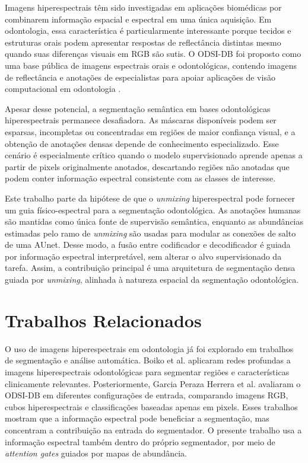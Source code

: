 \documentclass[conference]{IEEEtran}
\begin{document}
Imagens hiperespectrais têm sido investigadas em aplicações biomédicas por
combinarem informação espacial e espectral em uma única aquisição. Em
odontologia, essa característica é particularmente interessante porque tecidos e
estruturas orais podem apresentar respostas de reflectância distintas mesmo
quando suas diferenças visuais em RGB são sutis. O ODSI-DB foi proposto como
uma base pública de imagens espectrais orais e odontológicas, contendo imagens
de reflectância e anotações de especialistas para apoiar aplicações de visão
computacional em odontologia \cite{hyttinen2020odsi}.

Apesar desse potencial, a segmentação semântica em bases odontológicas
hiperespectrais permanece desafiadora. As máscaras disponíveis podem ser
esparsas, incompletas ou concentradas em regiões de maior confiança visual, e a
obtenção de anotações densas depende de conhecimento especializado. Esse cenário
é especialmente crítico quando o modelo supervisionado aprende apenas a partir de
pixels originalmente anotados, descartando regiões não anotadas que podem conter
informação espectral consistente com as classes de interesse.

Este trabalho parte da hipótese de que o \textit{unmixing} hiperespectral pode
fornecer um guia físico-espectral para a segmentação odontológica. As anotações
humanas são mantidas como única fonte de supervisão semântica, enquanto as
abundâncias estimadas pelo ramo de \textit{unmixing} são usadas para modular as
conexões de salto de uma AUnet. Desse modo, a fusão entre codificador
e decodificador é guiada por informação espectral interpretável, sem alterar o
alvo supervisionado da tarefa. Assim, a contribuição principal é uma arquitetura
de segmentação densa guiada por \textit{unmixing}, alinhada à natureza espacial
da segmentação odontológica.

\section{Trabalhos Relacionados}

O uso de imagens hiperespectrais em odontologia já foi explorado em trabalhos de
segmentação e análise automática. Boiko et al. \cite{boiko2019dentalhsi}
aplicaram redes profundas a imagens hiperespectrais odontológicas para segmentar
regiões e características clinicamente relevantes. Posteriormente, Garcia Peraza
Herrera et al. \cite{garcia2023odsisegmentation} avaliaram o ODSI-DB em
diferentes configurações de entrada, comparando imagens RGB, cubos
hiperespectrais e classificações baseadas apenas em pixels. Esses trabalhos
mostram que a informação espectral pode beneficiar a segmentação, mas concentram
a contribuição na entrada do segmentador. O presente trabalho usa a informação
espectral também dentro do próprio segmentador, por meio de \textit{attention
gates} guiados por mapas de abundância.
\end{document}
